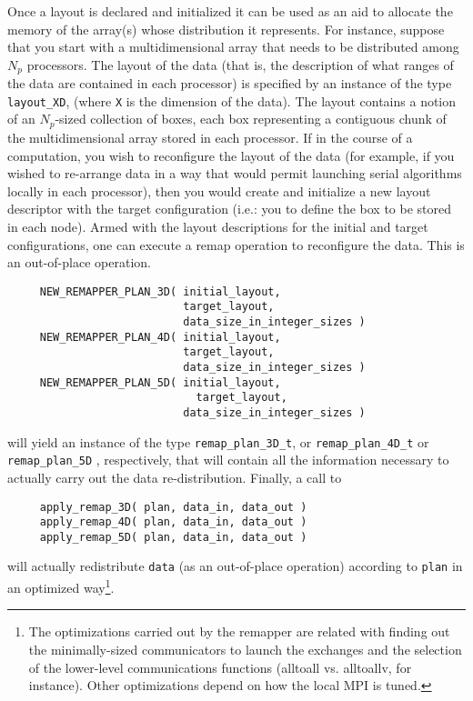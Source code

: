 \documentclass[]{report}   %
\begin{document}
Once a layout is declared and initialized it can be used as an aid to allocate the memory of the array(s) whose distribution it represents. For instance, suppose that you start with a multidimensional array that needs to be distributed among $N_p$ processors. The  layout of the data (that is, the description of what ranges of the data are contained in each processor) is specified by an instance of the type \verb+layout_XD+, (where \verb+X+ is the dimension of the data). The layout contains a notion of an $N_p$-sized collection of boxes, each box representing a contiguous chunk of the multidimensional array stored in each processor. If in the course of a computation, you wish to reconfigure the layout of the data (for example, if you wished to re-arrange data in a way that would permit launching serial algorithms locally in each processor), then you would create and initialize a new layout descriptor with the target configuration (i.e.: you to define the box to be stored in each node). Armed with the layout descriptions for the initial and target configurations, one can execute a remap operation to reconfigure the data. This is an out-of-place operation. 
\begin{verbatim}
     NEW_REMAPPER_PLAN_3D( initial_layout, 
                           target_layout, 
                           data_size_in_integer_sizes )
     NEW_REMAPPER_PLAN_4D( initial_layout, 
                           target_layout, 
                           data_size_in_integer_sizes )	
     NEW_REMAPPER_PLAN_5D( initial_layout, 
     	                     target_layout, 
                           data_size_in_integer_sizes )
\end{verbatim}
will yield an instance of the type \verb+remap_plan_3D_t+, or \verb+remap_plan_4D_t+ or \verb+remap_plan_5D+ , respectively, that will contain all the information necessary to actually carry out the data re-distribution. Finally, a call to 

\begin{verbatim}
     apply_remap_3D( plan, data_in, data_out )
     apply_remap_4D( plan, data_in, data_out )
     apply_remap_5D( plan, data_in, data_out )
\end{verbatim}
will actually redistribute \verb+data+ (as an out-of-place operation) according to \verb+plan+ in an optimized way\footnote{The optimizations carried out by the remapper are related with finding out the minimally-sized communicators to launch the exchanges and the selection of the lower-level
communications functions (alltoall vs. alltoallv, for instance). Other optimizations depend on how the local MPI is tuned.}. 
\end{document}
